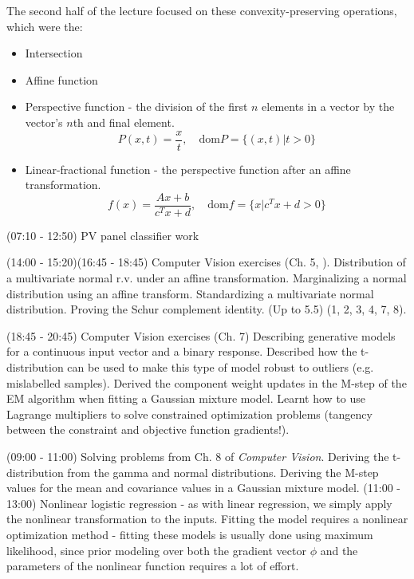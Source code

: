\documentclass[idxtotoc,hyperref,openany]{labbook} %
\begin{document}
The second half of the lecture focused on these convexity-preserving operations, which were the:
\begin{itemize}
	\item Intersection
	\item Affine function
	\item Perspective function - the division of the first $n$ elements in a vector by the vector's $n$th and final element.
	\[
		P(x, t) = \frac{x}{t}, \quad \text{dom}P = \{(x, t)|t > 0\}
	\]
	\item Linear-fractional function - the perspective function after an affine transformation.
	\[
		f(x) = \frac{Ax + b}{c^T x + d}, \quad \text{dom}f = \{x|c^T x + d > 0\}
	\]
\end{itemize}




(07:10 - 12:50) PV panel classifier work

(14:00 - 15:20)(16:45 - 18:45) Computer Vision exercises (Ch. 5, ). Distribution of a multivariate normal r.v. under an affine transformation. Marginalizing a normal distribution using an affine transform. Standardizing a multivariate normal distribution. Proving the Schur complement identity. (Up to 5.5) (1, 2, 3, 4, 7, 8).

(18:45 - 20:45) Computer Vision exercises (Ch. 7) Describing generative models for a continuous input vector and a binary response. Described how the t-distribution can be used to make this type of model robust to outliers (e.g. mislabelled samples). Derived the component weight updates in the M-step of the EM algorithm when fitting a Gaussian mixture model. Learnt how to use Lagrange multipliers to solve constrained optimization problems (tangency between the constraint and objective function gradients!). 



(09:00 - 11:00) Solving problems from Ch. 8 of \emph{Computer Vision}. Deriving the t-distribution from the gamma and normal distributions. Deriving the M-step values for the mean and covariance values in a Gaussian mixture model.
(11:00 - 13:00) Nonlinear logistic regression - as with linear regression, we simply apply the nonlinear transformation to the inputs. Fitting the model requires a nonlinear optimization method - fitting these models is usually done using maximum likelihood, since prior modeling over both the gradient vector $\phi$ and the parameters of the nonlinear function requires a lot of effort.
\end{document}
